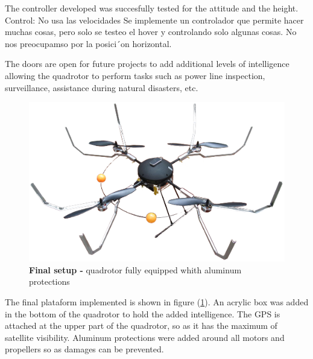 \documentclass[conference]{IEEEtran}
\newcommand{\refp}[1]{(\ref{#1})}
\begin{document}
The controller developed was succesfully tested for the attitude and the height. 
Control: No usa las velocidades Se implemente un controlador que permite hacer muchas cosas, pero solo se testeo el hover y controlando solo algunas cosas. No nos preocupamso por la posici´on horizontal. 


The doors are open for future projects to add additional levels of intelligence allowing the quadrotor to perform tasks such as power line inspection, surveillance, assistance during natural disasters, etc.

\begin{figure}
	\centering
	\includegraphics[width=1\columnwidth]{./pics_paper/tito.png}
	\caption{\textbf{Final setup -} quadrotor fully equipped whith aluminum protections}
	\label{fig:tito}
\end{figure}

The final plataform implemented is shown in figure \refp{fig:tito}. An acrylic box was added in the bottom of the quadrotor to hold the added intelligence. The GPS is attached at the upper part of the quadrotor, so as it has the maximum of satellite visibility. Aluminum protections were added around all motors and propellers so as damages can be prevented.
\end{document}
